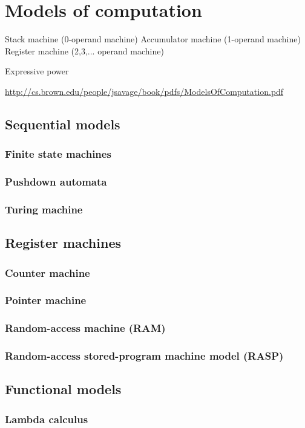 \section{Models of computation}
    Stack machine (0-operand machine)
    Accumulator machine (1-operand machine)
    Register machine (2,3,... operand machine)

Expressive power

\url{http://cs.brown.edu/people/jsavage/book/pdfs/ModelsOfComputation.pdf}

\subsection{Sequential models}
\subsubsection{Finite state machines}
\subsubsection{Pushdown automata}
\subsubsection{Turing machine}
\subsection{Register machines}
\subsubsection{Counter machine}
\subsubsection{Pointer machine}
\subsubsection{Random-access machine (RAM)}
\subsubsection{Random-access stored-program machine model (RASP)}
\subsection{Functional models}
\subsubsection{Lambda calculus}
